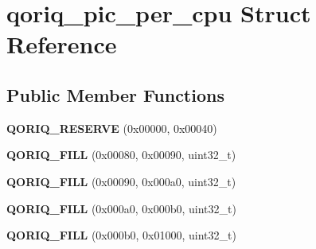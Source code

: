 \hypertarget{structqoriq__pic__per__cpu}{}\section{qoriq\+\_\+pic\+\_\+per\+\_\+cpu Struct Reference}
\label{structqoriq__pic__per__cpu}
\subsection*{Public Member Functions}
\begin{DoxyCompactItemize}
\item 
\mbox{\label{structqoriq__pic__per__cpu_a5294599bc5007076c551a93fd2e94ad6}} 
{\bfseries Q\+O\+R\+I\+Q\+\_\+\+R\+E\+S\+E\+R\+VE} (0x00000, 0x00040)
\item 
\mbox{\label{structqoriq__pic__per__cpu_ae404fd7331f29911ef10997e9f1e312d}} 
{\bfseries Q\+O\+R\+I\+Q\+\_\+\+F\+I\+LL} (0x00080, 0x00090, uint32\+\_\+t)
\item 
\mbox{\label{structqoriq__pic__per__cpu_ac0f43c68827d07ef64a68c882b6144c5}} 
{\bfseries Q\+O\+R\+I\+Q\+\_\+\+F\+I\+LL} (0x00090, 0x000a0, uint32\+\_\+t)
\item 
\mbox{\label{structqoriq__pic__per__cpu_ae6dee8baa4f07ca35f7ce8de6ce39035}} 
{\bfseries Q\+O\+R\+I\+Q\+\_\+\+F\+I\+LL} (0x000a0, 0x000b0, uint32\+\_\+t)
\item 
\mbox{\label{structqoriq__pic__per__cpu_a236543ece175fa31ced3e38f89451860}} 
{\bfseries Q\+O\+R\+I\+Q\+\_\+\+F\+I\+LL} (0x000b0, 0x01000, uint32\+\_\+t)
\end{DoxyCompactItemize}
